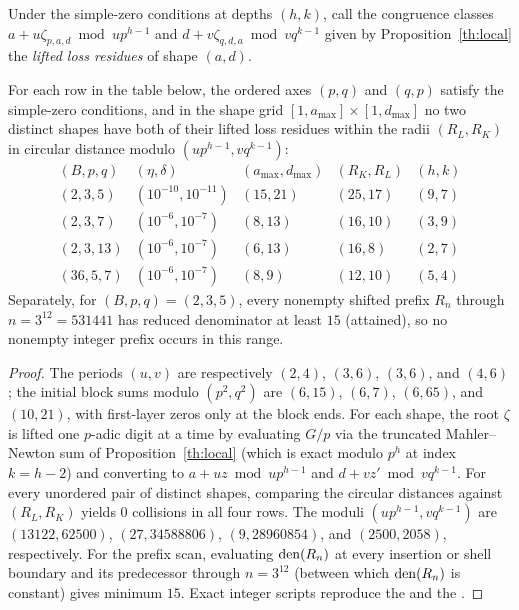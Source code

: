 \documentclass[11pt]{article}
\begin{document}
Under the simple-zero conditions at depths $(h,k)$, call the congruence classes $a+u\zeta_{p,a,d}\bmod up^{h-1}$ and $d+v\zeta_{q,d,a}\bmod vq^{k-1}$ given by Proposition~\ref{th:local} the \emph{lifted loss residues} of shape $(a,d)$.

\begin{proposition}\label{th:cert}
For each row in the table below, the ordered axes $(p,q)$ and $(q,p)$ satisfy the simple-zero conditions, and in the shape grid $[1,a_{\max}]\times[1,d_{\max}]$ no two distinct shapes have both of their lifted loss residues within the radii $(R_L,R_K)$ in circular distance modulo $(up^{h-1},vq^{k-1})$:
\[
\begin{array}{c|c|c|c|c}
(B,p,q)&(\eta,\delta)&(a_{\max},d_{\max})&(R_K,R_L)&(h,k)\\ \hline
(2,3,5)&(10^{-10},10^{-11})&(15,21)&(25,17)&(9,7)\\
(2,3,7)&(10^{-6},10^{-7})&(8,13)&(16,10)&(3,9)\\
(2,3,13)&(10^{-6},10^{-7})&(6,13)&(16,8)&(2,7)\\
(36,5,7)&(10^{-6},10^{-7})&(8,9)&(12,10)&(5,4)
\end{array}
\]
Separately, for $(B,p,q)=(2,3,5)$, every nonempty shifted prefix $R_n$ through $n=3^{12}=531441$ has reduced denominator at least $15$ (attained), so no nonempty integer prefix occurs in this range.
\end{proposition}
\begin{proof}
The periods $(u,v)$ are respectively $(2,4)$, $(3,6)$, $(3,6)$, and $(4,6)$; the initial block sums modulo $(p^2,q^2)$ are $(6,15)$, $(6,7)$, $(6,65)$, and $(10,21)$, with first-layer zeros only at the block ends. For each shape, the root $\zeta$ is lifted one $p$-adic digit at a time by evaluating $G/p$ via the truncated Mahler--Newton sum of Proposition~\ref{th:local} (which is exact modulo $p^h$ at index $k=h-2$) and converting to $a+uz\bmod up^{h-1}$ and $d+vz'\bmod vq^{k-1}$. For every unordered pair of distinct shapes, comparing the circular distances against $(R_L,R_K)$ yields $0$ collisions in all four rows. The moduli $(up^{h-1},vq^{k-1})$ are $(13122,62500)$, $(27,34588806)$, $(9,28960854)$, and $(2500,2058)$, respectively. For the prefix scan, evaluating $\operatorname{den}(R_n)$ at every insertion or shell boundary and its predecessor through $n=3^{12}$ (between which $\operatorname{den}(R_n)$ is constant) gives minimum $15$. Exact integer scripts reproduce the  and the .
\end{proof}
\end{document}
